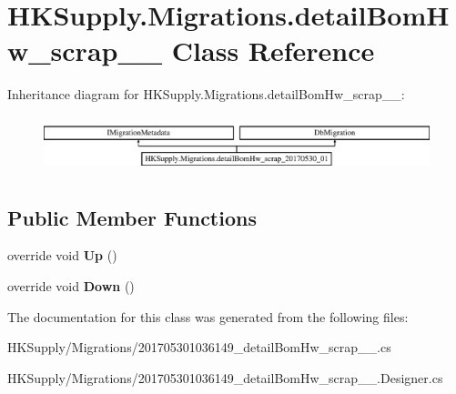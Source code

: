 \hypertarget{class_h_k_supply_1_1_migrations_1_1detail_bom_hw__scrap__20170530__01}{}\section{H\+K\+Supply.\+Migrations.\+detail\+Bom\+Hw\+\_\+scrap\+\_\+\_ Class Reference}
\label{class_h_k_supply_1_1_migrations_1_1detail_bom_hw__scrap__20170530__01}
Inheritance diagram for H\+K\+Supply.\+Migrations.\+detail\+Bom\+Hw\+\_\+scrap\+\_\+\_\+:\begin{figure}[H]
\begin{center}
\leavevmode
\includegraphics[height=1.656805cm]{class_h_k_supply_1_1_migrations_1_1detail_bom_hw__scrap__20170530__01}
\end{center}
\end{figure}
\subsection*{Public Member Functions}
\begin{DoxyCompactItemize}
\item 
\mbox{\label{class_h_k_supply_1_1_migrations_1_1detail_bom_hw__scrap__20170530__01_a2812c2e2942628598395a1e6594ea71a}} 
override void {\bfseries Up} ()
\item 
\mbox{\label{class_h_k_supply_1_1_migrations_1_1detail_bom_hw__scrap__20170530__01_a3609cc662ea1e4e65a00b527688e64fe}} 
override void {\bfseries Down} ()
\end{DoxyCompactItemize}


The documentation for this class was generated from the following files\+:\begin{DoxyCompactItemize}
\item 
H\+K\+Supply/\+Migrations/201705301036149\+\_\+detail\+Bom\+Hw\+\_\+scrap\+\_\+\_.\+cs\item 
H\+K\+Supply/\+Migrations/201705301036149\+\_\+detail\+Bom\+Hw\+\_\+scrap\+\_\+\_.\+Designer.\+cs\end{DoxyCompactItemize}
